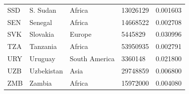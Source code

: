 \documentclass[11pt]{report}
\begin{document}
\begin{table}[h!]
\begin{tabular}{lllll}
            SSD                           & S. Sudan                  & Africa                         & 13026129                      & 0.001603                           \\
            SEN                           & Senegal                   & Africa                         & 14668522                      & 0.002708                           \\
            SVK                           & Slovakia                  & Europe                         & 5445829                       & 0.030996                           \\
            TZA                           & Tanzania                  & Africa                         & 53950935                      & 0.002791                           \\
            URY                           & Uruguay                   & South America                  & 3360148                       & 0.021800                           \\
            UZB                           & Uzbekistan                & Asia                           & 29748859                      & 0.006800                           \\
            ZMB                           & Zambia                    & Africa                         & 15972000                      & 0.004080
        \end{tabular}
    \end{table}
\end{document}
